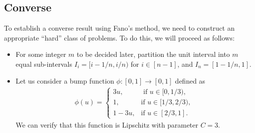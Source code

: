\documentclass[12pt]{article}
\begin{document}
\subsection{Converse}
\label{subsec:nonparametric-regression-converse}
To establish a converse result using Fano's method, we need to construct an appropriate ``hard'' class of problems. To do this, we will proceed as follows: 
\begin{itemize}
	\item For some integer $m$ to be decided later, partition the unit interval into $m$ equal sub-intervals $I_i = [i-1/n, i/n)$ for $i \in [n-1]$, and $I_n = [1-1/n, 1]$. 
	\item Let us consider a bump function $\phi: [0, 1] \to [0,1]$ defined as 
	\begin{align}
		\phi(u) = \begin{cases}
		3u, & \text{ if } u \in [0, 1/3), \\
		1, & \text{if } u \in [1/3, 2/3), \\
		1-3u, & \text{if } u \in [2/3, 1]. 
		\end{cases}
	\end{align}
	We can verify that this function is Lipschitz with parameter $C=3$. 


\end{itemize}
\end{document}
